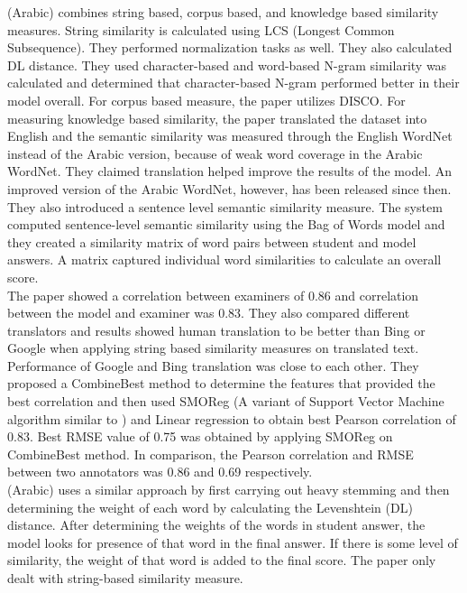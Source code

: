 \documentclass{article}
\begin{document}
	\textbf{\textcite{1_gomaa2014arabic}} (Arabic) combines string based, corpus based, and knowledge based similarity measures. String similarity is calculated using LCS (Longest Common Subsequence). They performed normalization tasks as well. They also calculated DL distance. They used character-based and word-based N-gram similarity was calculated and determined that character-based N-gram performed better in their model overall. 
	For corpus based measure, the paper utilizes DISCO. For measuring knowledge based similarity, the paper translated the dataset into English and the semantic similarity was measured through the English WordNet instead of the Arabic version, because of weak word coverage in the Arabic WordNet. They claimed translation helped improve the results of the model. An improved version of the Arabic WordNet, however, has been released since then. \\ They also introduced a sentence level semantic similarity measure. The system computed sentence-level semantic similarity using the Bag of Words model and they created a similarity matrix of word pairs between student and model answers. A matrix captured individual word similarities to calculate an overall score. \\ The paper showed a correlation between examiners of 0.86 and correlation between the model and examiner was 0.83. They also compared different translators and results showed human translation to be better than Bing or Google when applying string based similarity measures on translated text. Performance of Google and Bing translation was close to each other. They proposed a CombineBest method to determine the features that provided the best correlation and then used SMOReg (A variant of Support Vector Machine algorithm similar to \textcite{4_abdeljaber2021wordnet}) and Linear regression to obtain best Pearson correlation of 0.83. Best RMSE value of 0.75 was obtained by applying SMOReg on CombineBest method. In comparison, the Pearson correlation and RMSE between two annotators was 0.86 and 0.69 respectively. \\
	
	\textbf{\textcite{2_shalabi2016levenshtein}} (Arabic) uses a similar approach by first carrying out heavy stemming and then determining the weight of each word by calculating the Levenshtein (DL) distance. After determining the weights of the words in student answer, the model looks for presence of that word in the final answer. If there is some level of similarity, the weight of that word is added to the final score. The paper only dealt with string-based similarity measure. \\
	
\end{document}
